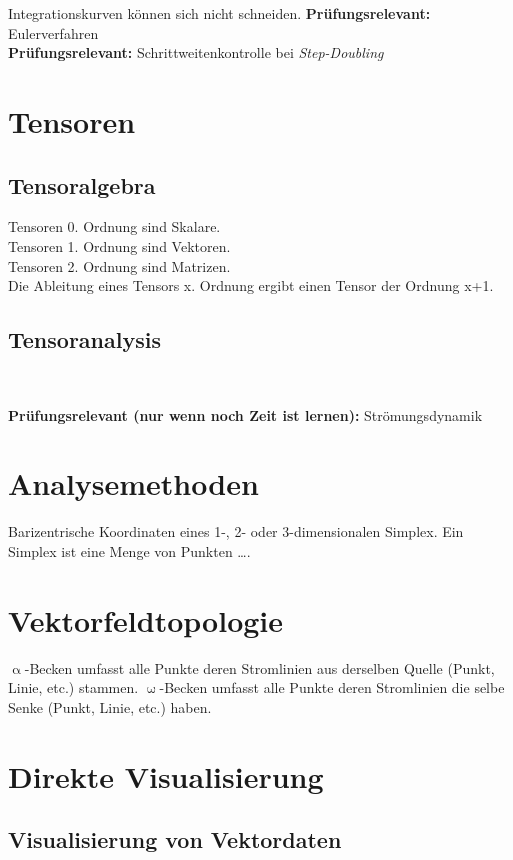 \documentclass[12pt,a4paper,oneside,normalheadings,abstracton,liststotoc,bibtotoc,titlepage,pdftex]{scrbook}
\begin{document}
Integrationskurven können sich nicht schneiden.
\textbf{Prüfungsrelevant:} Eulerverfahren\\
\textbf{Prüfungsrelevant:} Schrittweitenkontrolle bei \textit{Step-Doubling}\\



\section{Tensoren}
\subsection{Tensoralgebra}
Tensoren 0. Ordnung sind Skalare.\\
Tensoren 1. Ordnung sind Vektoren.\\
Tensoren 2. Ordnung sind Matrizen.\\
Die Ableitung eines Tensors x. Ordnung ergibt einen Tensor der Ordnung x+1. 
\subsection{Tensoranalysis}

\


\textbf{Prüfungsrelevant (nur wenn noch Zeit ist lernen):} Strömungsdynamik\\

\section{Analysemethoden}
Barizentrische Koordinaten eines 1-, 2- oder 3-dimensionalen Simplex. Ein Simplex ist eine Menge von Punkten \dots . 

\section{Vektorfeldtopologie}
$\upalpha$-Becken umfasst alle Punkte deren Stromlinien aus derselben Quelle (Punkt, Linie, etc.) stammen. $\upomega$-Becken umfasst alle Punkte deren Stromlinien die selbe Senke (Punkt, Linie, etc.) haben.

\section{Direkte Visualisierung}
\subsection{Visualisierung von Vektordaten}
\end{document}
